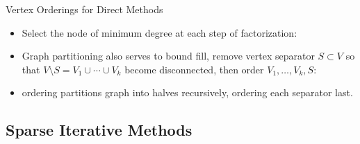 \begin{frame}{Vertex Orderings for Direct Methods}


\begin{itemize}
\item Select the node of minimum degree at each step of factorization:


\item Graph partitioning also serves to bound fill, remove vertex separator $S \subset V$ so that $V \setminus S = V_1 \cup \cdots \cup V_k$ become disconnected, then order $V_1,\ldots,V_k, S$:


\item {} ordering partitions graph into halves recursively, ordering each separator last.

\lgcond{

}

\end{itemize}
\end{frame}

\subsection{Sparse Iterative Methods}

